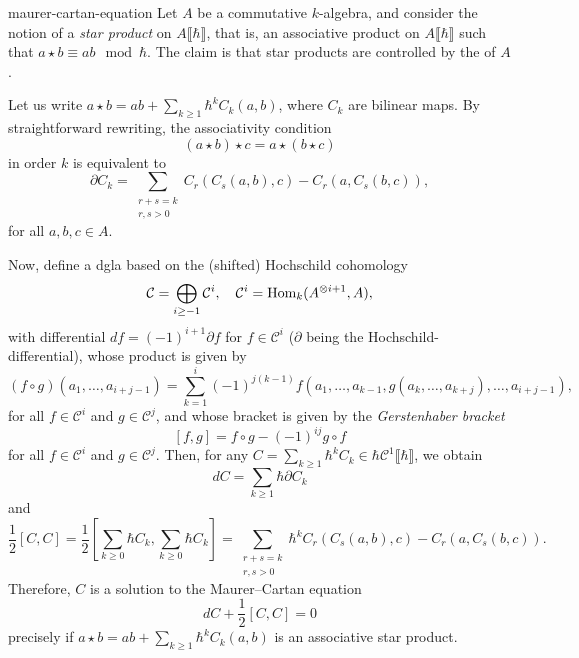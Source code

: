 \begin{example}{maurer-cartan-equation}
    Let $A$ be a commutative $k$-algebra, and consider the notion of a \textit{star product} on $A \llbracket \hbar \rrbracket$, that is, an associative product on $A \llbracket \hbar \rrbracket$ such that $a \star b \equiv ab \mod \hbar$. The claim is that star products are controlled by the  of $A$.
    
    Let us write $a \star b = ab + \sum_{k \ge 1} \hbar^k C_k(a, b)$, where $C_k$ are bilinear maps. By straightforward rewriting, the associativity condition
    \[ (a \star b) \star c = a \star (b \star c) \]
    in order $k$ is equivalent to
    \[ \partial C_k = \sum_{\substack{r + s = k \\ r, s > 0}} C_r(C_s(a, b), c) - C_r(a, C_s(b, c)) , \]
    for all $a, b, c \in A$.
    
    Now, define a dgla based on the (shifted) Hochschild cohomology
    \[ \mathcal{C} = \bigoplus_{i \ge -1} \mathcal{C}^i, \quad \mathcal{C}^i = \text{Hom}_k(A^{\otimes i + 1}, A) , \]
    with differential $df = (-1)^{i + 1} \partial f$ for $f \in \mathcal{C}^i$ ($\partial$ being the Hochschild-differential), whose product is given by
    \[ (f \circ g)(a_1, \ldots, a_{i + j - 1}) = \sum_{k = 1}^{i} (-1)^{j(k - 1)} f(a_1, \ldots, a_{k - 1}, g(a_k, \ldots, a_{k + j}), \ldots, a_{i + j - 1}) , \] for all $f \in \mathcal{C}^i$ and $g \in \mathcal{C}^j$, and whose bracket is given by the \textit{Gerstenhaber bracket}
    \[ [f, g] = f \circ g - (-1)^{ij} g \circ f \]
    for all $f \in \mathcal{C}^i$ and $g \in \mathcal{C}^j$.
    Then, for any $C = \sum_{k \ge 1} \hbar^k C_k \in \hbar \mathcal{C}^1 \llbracket \hbar \rrbracket$, we obtain
    \[ dC = \sum_{k \ge 1} \hbar \partial C_k \]
    and
    \[ \frac{1}{2} [C, C] = \frac{1}{2} \left[ \sum_{k \ge 0} \hbar C_k, \sum_{k \ge 0} \hbar C_k \right] = \sum_{\substack{r + s = k \\ r, s > 0}} \hbar^k C_r(C_s(a, b), c) - C_r(a, C_s(b, c)) . \]
    Therefore, $C$ is a solution to the Maurer--Cartan equation
    \[ dC + \frac{1}{2}[C, C] = 0 \]
    precisely if $a \star b = ab + \sum_{k \ge 1} \hbar^k C_k(a, b)$ is an associative star product.
\end{example}
